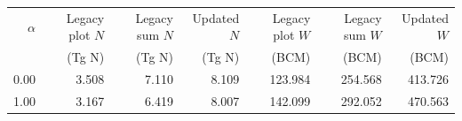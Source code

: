 \begin{tabular}{rrrrrrr}
\toprule
$\alpha$ & Legacy plot $N$ & Legacy sum $N$ & Updated $N$ & Legacy plot $W$ & Legacy sum $W$ & Updated $W$ \\
& (Tg N) & (Tg N) & (Tg N) & (BCM) & (BCM) & (BCM) \\
\midrule
0.00 & 3.508 & 7.110 & 8.109 & 123.984 & 254.568 & 413.726 \\
1.00 & 3.167 & 6.419 & 8.007 & 142.099 & 292.052 & 470.563 \\
\bottomrule
\end{tabular}
